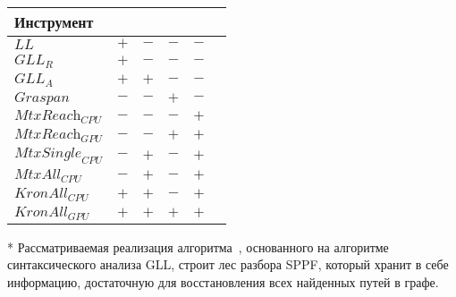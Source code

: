 \begin{table} [h]
\begin{threeparttable}
  \begin{tabular}{| p{3.5cm} || p{2.4cm} | p{2.4cm} | p{2.4cm} | p{2.4cm}l |}
  \hline                               
  \hline
  {Инструмент}              &\centering {Без преобразований}        &\centering {Восст. путей}    &\centering {GPU} &\centering {Лин. алгебра}  & \\
  \hline
  $\textit{LL}$                         &\centering  $+$                  &\centering  $-$             &\centering  $-$   &\centering  $-$  &\\
  $\textit{GLL}_{\textit{R}}$                &\centering  $+$                  &\centering  $-$              &\centering  $-$   &\centering  $-$    & \\
  $\textit{GLL}_{\textit{A}}$                &\centering  $+$                  &\centering  $+$\tnote{*}              &\centering  $-$   &\centering  $-$    & \\
  $\textit{Graspan}$                       &\centering  $-$\tnote{**}                   &\centering  $-$             &\centering  $+$\tnote{***} &\centering  $-$       &\\
  $\textit{MtxReach}_{\textit{CPU}}$                           &\centering  $-$                  &\centering  $-$             &\centering  $-$  &\centering  $+$   &\\
  $\textit{MtxReach}_{\textit{GPU}}$                          &\centering  $-$                  &\centering  $-$             &\centering  $+$  &\centering  $+$   &\\
  $\textit{MtxSingle}_{\textit{CPU}}$                           &\centering  $-$                  &\centering  $+$             &\centering  $-$\tnote{****}  &\centering  $+$   &\\
  $\textit{MtxAll}_{\textit{CPU}}$                           &\centering  $-$                  &\centering  $+$             &\centering  $-$\tnote{****}  &\centering  $+$   &\\
  $\textit{KronAll}_{\textit{CPU}}$                      &\centering  $+$                  &\centering  $+$             &\centering  $-$  &\centering  $+$    &\\
  $\textit{KronAll}_{\textit{GPU}}$                      &\centering  $+$                  &\centering  $+$             &\centering  $+$  &\centering  $+$    &\\
  \hline
  \hline
  \end{tabular}\small{
  \begin{tablenotes}
            \item[*] Рассматриваемая реализация алгоритма~\cite{grigorev2017context}, основанного на алгоритме синтаксического анализа GLL, строит лес разбора SPPF, который хранит в себе информацию, достаточную для восстановления всех найденных путей в графе.

\end{tablenotes}}
\end{threeparttable}
\end{table}
